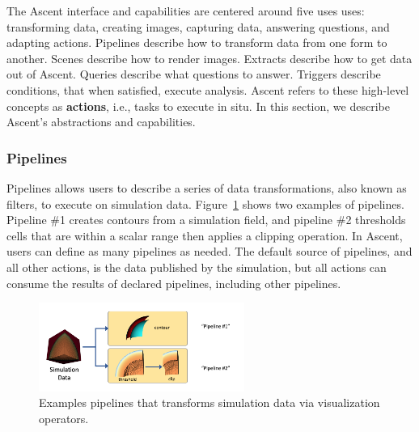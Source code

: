 The Ascent interface and capabilities are centered around five uses uses:
transforming data, creating images, capturing data, answering questions,
and adapting actions.
%
%
Pipelines describe how to transform data from one form to another.
%
Scenes describe how to render images.
%
Extracts describe how to get data out of Ascent.
%
Queries describe what questions to answer.
%
Triggers describe conditions, that when satisfied, execute analysis.
%
Ascent refers to these high-level concepts as \textbf{actions},
i.e., tasks to execute in situ.
In this section, we describe Ascent's abstractions and capabilities.


\subsubsection{Pipelines}
Pipelines allows users to describe a series of data transformations, also known as
filters, to execute on simulation data.
%
Figure~\ref{img:pipelines} shows two examples of pipelines.
%
Pipeline \#1 creates contours from a simulation field, and pipeline \#2
thresholds cells that are within a scalar range then applies a clipping operation.
%
In Ascent, users can define as many pipelines as needed.
%
The default source of pipelines, and all other actions, is the data
published by the simulation, but all actions can consume the results
of declared pipelines, including other pipelines.

\begin{figure}
\centering
\includegraphics[width=0.6\textwidth]{images/pipelines}
\caption{\label{img:pipelines} Examples pipelines that transforms simulation data via visualization operators.}
\end{figure}

